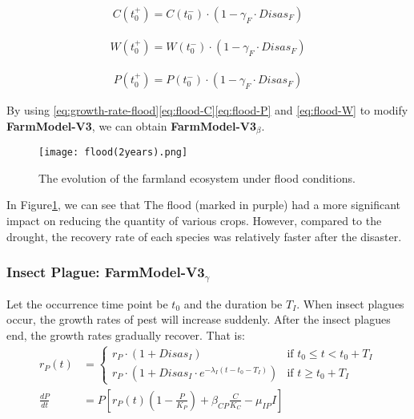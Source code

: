 \documentclass[12pt]{article}  %
\begin{document}
\begin{equation}
    \begin{aligned}
    C(t_0^+) = C(t_0^-) \cdot (1 - \gamma_F \cdot Disas_F)
    \end{aligned}\label{eq:flood-C}
\end{equation}

\begin{equation}
    \begin{aligned}
    W(t_0^+) = W(t_0^-) \cdot (1 - \gamma_F \cdot Disas_F)
    \end{aligned}\label{eq:flood-W}
\end{equation}

\begin{equation}
    \begin{aligned}
        P(t_0^+) = P(t_0^-) \cdot (1 - \gamma_F \cdot Disas_F)
    \end{aligned}\label{eq:flood-P}
\end{equation}

By using \eqref{eq:growth-rate-flood}\eqref{eq:flood-C}\eqref{eq:flood-P}
 and \eqref{eq:flood-W} to modify \textbf{FarmModel-V3}, we can obtain \textbf{FarmModel-V3$_{\beta}$}.

\begin{figure}
    \centering
    \texttt{[image: flood(2years).png]}
    \caption{The evolution of the farmland ecosystem under flood conditions.}
    \label{fig:Flood Influence}
\end{figure}

In Figure\ref{fig:Flood Influence}, we can see that The flood (marked 
in purple) had a more significant impact on reducing the quantity of 
various crops. However, compared to the drought, the recovery rate of 
each species was relatively faster after the disaster.

\subsubsection{Insect Plague: FarmModel-V3$_{\gamma}$}

Let the occurrence time point be $t_0$ and the duration be $T_I$. 
When insect plagues occur, the growth rates of pest will increase 
suddenly. After the insect plagues end, the growth rates gradually recover. 
That is:
\begin{equation}
    \begin{aligned}
        r_P(t) &= 
        \begin{cases} 
        r_P \cdot (1 + Disas_I) & \text{if } t_0 \leq t < t_0 + T_I \\
        r_P \cdot \left(1 + Disas_I \cdot e^{-\lambda_I (t - t_0 - T_I)}\right) & \text{if } t \geq t_0 + T_I
        \end{cases}\\
        \frac{dP}{dt} &= P \left[ r_P(t) \left( 1 - \frac{P}{K_P} \right) + \beta_{CP} \frac{C}{K_C} - \mu_{IP} I \right]
    \end{aligned}
\end{equation}
\end{document}
